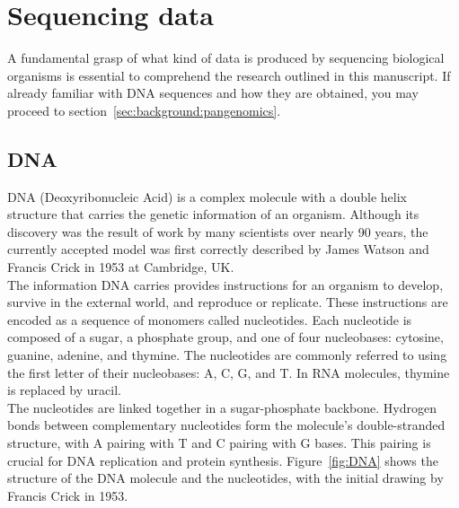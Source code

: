 \section{Sequencing data}
\label{sec:background:sequencing}
A fundamental grasp of what kind of data is produced by sequencing biological organisms is essential to comprehend the research outlined in this manuscript. If already familiar with DNA sequences and how they are obtained, you may proceed to section~\ref{sec:background:pangenomics}.
\subsection{DNA}
DNA (Deoxyribonucleic Acid) is a complex molecule with a double helix structure that carries the genetic information of an organism. Although its discovery was the result of work by many scientists over nearly 90 years, the currently accepted model was first correctly described by James Watson and Francis Crick in 1953 at Cambridge, UK.\\
The information DNA carries provides instructions for an organism to develop, survive in the external world, and reproduce or replicate. These instructions are encoded as a sequence of monomers called nucleotides. Each nucleotide is composed of a sugar, a phosphate group, and one of four nucleobases: cytosine, guanine, adenine, and thymine. The nucleotides are commonly referred to using the first letter of their nucleobases: A, C, G, and T. In RNA molecules, thymine is replaced by uracil.\\
The nucleotides are linked together in a sugar-phosphate backbone. Hydrogen bonds between complementary nucleotides form the molecule's double-stranded structure, with A pairing with T and C pairing with G bases. This pairing is crucial for DNA replication and protein synthesis. Figure~\ref{fig:DNA} shows the structure of the DNA molecule and the nucleotides, with the initial drawing by Francis Crick in 1953.
